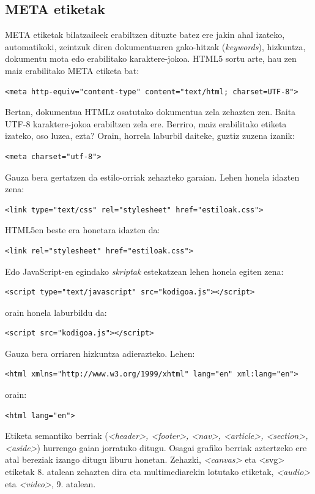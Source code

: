 \subsection{META etiketak}

META etiketak bilatzaileek erabiltzen dituzte batez ere jakin ahal izateko, automatikoki, zeintzuk diren dokumentuaren gako-hitzak (\textit{keywords}), hizkuntza, dokumentu mota edo erabilitako karaktere-jokoa. HTML5 sortu arte, hau zen maiz erabilitako META etiketa bat:
\begin{lstlisting}[numbers=none]
<meta http-equiv="content-type" content="text/html; charset=UTF-8">
\end{lstlisting}
Bertan, dokumentua HTMLz osatutako dokumentua zela zehazten zen. Baita UTF-8 karaktere-jokoa erabiltzen zela ere. Berriro, maiz erabilitako etiketa izateko, oso luzea, ezta? Orain, horrela laburbil daiteke, guztiz zuzena izanik:
\begin{lstlisting}[numbers=none]
<meta charset="utf-8">
\end{lstlisting}

Gauza bera gertatzen da estilo-orriak zehazteko garaian. Lehen honela idazten zena: 
\begin{lstlisting}[numbers=none]
<link type="text/css" rel="stylesheet" href="estiloak.css">
\end{lstlisting}
HTML5en beste era honetara idazten da:
\begin{lstlisting}[numbers=none]
<link rel="stylesheet" href="estiloak.css">
\end{lstlisting}
Edo JavaScript-en egindako \textit{skriptak} estekatzean lehen honela egiten zena: 
\begin{lstlisting}[numbers=none]
<script type="text/javascript" src="kodigoa.js"></script>
\end{lstlisting}
orain honela laburbildu da: 
\begin{lstlisting}[numbers=none]
<script src="kodigoa.js"></script>
\end{lstlisting}
Gauza bera orriaren hizkuntza adierazteko. Lehen:
\begin{lstlisting}[numbers=none]
<html xmlns="http://www.w3.org/1999/xhtml" lang="en" xml:lang="en"> 
\end{lstlisting}
orain:
\begin{lstlisting}[numbers=none]
<html lang="en">
\end{lstlisting}

Etiketa semantiko berriak (\textit{<header>, <footer>, <nav>, <article>, <section>, <aside>}) hurrengo gaian jorratuko ditugu. Osagai grafiko berriak aztertzeko ere atal bereziak izango ditugu liburu honetan. Zehazki, \textit{<canvas>} eta <svg> etiketak 8. atalean zehazten dira eta multimediarekin lotutako etiketak, \textit{<audio>} eta \textit{<video>}, 9. atalean.

